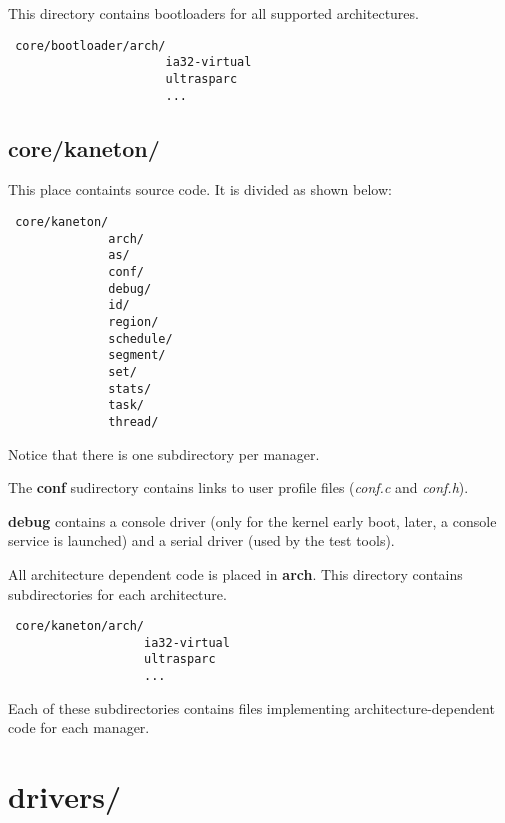 This directory contains bootloaders for all supported architectures.

\begin{verbatim}
 core/bootloader/arch/
                      ia32-virtual
                      ultrasparc
                      ...
\end{verbatim}

\subsection*{core/kaneton/}

This place containts \kaneton source code. It is divided as shown below:

\begin{verbatim}
 core/kaneton/
              arch/
              as/
              conf/
              debug/
              id/
              region/
              schedule/
              segment/
              set/
              stats/
              task/
              thread/
\end{verbatim}

Notice that there is one subdirectory per manager.

The  \textbf{conf} sudirectory  contains links  to user  profile files
(\textit{conf.c} and \textit{conf.h}).

\textbf{debug} contains  a console driver  (only for the  kernel early
boot, later, a console service  is launched) and a serial driver (used
by the test tools).

All  architecture  dependent code  is  placed  in \textbf{arch}.  This
directory contains subdirectories for each architecture.

\begin{verbatim}
 core/kaneton/arch/
                   ia32-virtual
                   ultrasparc
                   ...
\end{verbatim}

Each   of    these   subdirectories   contains    files   implementing
architecture-dependent code for each manager.

\section{drivers/}

